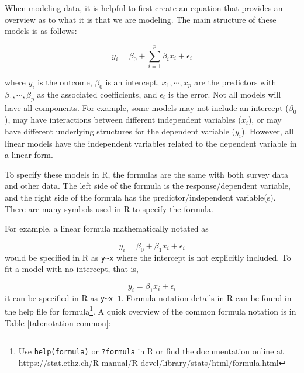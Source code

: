 \documentclass[
]{krantz}
\begin{document}
When modeling data, it is helpful to first create an equation that provides an overview as to what it is that we are modeling. The main structure of these models is as follows:

\[y_i=\beta_0 +\sum_{i=1}^p \beta_i x_i + \epsilon_i\]

where \(y_i\) is the outcome, \(\beta_0\) is an intercept, \(x_1, \cdots, x_p\) are the predictors with \(\beta_1, \cdots, \beta_p\) as the associated coefficients, and \(\epsilon_i\) is the error. Not all models will have all components. For example, some models may not include an intercept (\(\beta_0\)), may have interactions between different independent variables (\(x_i\)), or may have different underlying structures for the dependent variable (\(y_i\)). However, all linear models have the independent variables related to the dependent variable in a linear form.

To specify these models in R, the formulas are the same with both survey data and other data. The left side of the formula is the response/dependent variable, and the right side of the formula has the predictor/independent variable(s). There are many symbols used in R to specify the formula.

For example, a linear formula mathematically notated as

\[y_i=\beta_0+\beta_1 x_i+\epsilon_i\] would be specified in R as \texttt{y\textasciitilde{}x} where the intercept is not explicitly included. To fit a model with no intercept, that is,

\[y_i=\beta_1 x_i+\epsilon_i\]
it can be specified in R as \texttt{y\textasciitilde{}x-1}. Formula notation details in R can be found in the help file for formula\footnote{Use \texttt{help(formula)} or \texttt{?formula} in R or find the documentation online at \url{https://stat.ethz.ch/R-manual/R-devel/library/stats/html/formula.html}}. A quick overview of the common formula notation is in Table \ref{tab:notation-common}:
\end{document}
